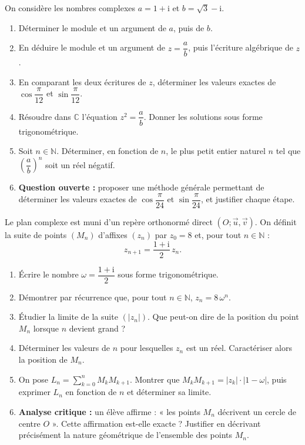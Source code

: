 \documentclass[11pt]{article}
\begin{document}
\begin{exercice}
On considère les nombres complexes $a=1+\mathrm{i}$ et $b=\sqrt{3}-\mathrm{i}$.
\begin{enumerate}
  \item Déterminer le module et un argument de $a$, puis de $b$.
  \item En déduire le module et un argument de $z=\dfrac{a}{b}$, puis l'écriture algébrique de $z$.
  \item En comparant les deux écritures de $z$, déterminer les valeurs exactes de $\cos\dfrac{\pi}{12}$ et $\sin\dfrac{\pi}{12}$.
  \item Résoudre dans $\mathbb{C}$ l'équation $z^2=\dfrac{a}{b}$. Donner les solutions sous forme trigonométrique.
  \item Soit $n\in\mathbb{N}$. Déterminer, en fonction de $n$, le plus petit entier naturel $n$ tel que $\left(\dfrac{a}{b}\right)^n$ soit un réel négatif.
  \item \textbf{Question ouverte :} proposer une méthode générale permettant de déterminer les valeurs exactes de $\cos\dfrac{\pi}{24}$ et $\sin\dfrac{\pi}{24}$, et justifier chaque étape.
\end{enumerate}
\end{exercice}

\begin{exercice}
Le plan complexe est muni d'un repère orthonormé direct $(O;\vec{u},\vec{v})$. On définit la suite de points $(M_n)$ d'affixes $(z_n)$ par $z_0=8$ et, pour tout $n\in\mathbb{N}$ :
\[ z_{n+1}=\frac{1+\mathrm{i}}{2}\,z_n. \]
\begin{enumerate}
  \item Écrire le nombre $\omega=\dfrac{1+\mathrm{i}}{2}$ sous forme trigonométrique.
  \item Démontrer par récurrence que, pour tout $n\in\mathbb{N}$, $z_n=8\,\omega^n$.
  \item Étudier la limite de la suite $(|z_n|)$. Que peut-on dire de la position du point $M_n$ lorsque $n$ devient grand ?
  \item Déterminer les valeurs de $n$ pour lesquelles $z_n$ est un réel. Caractériser alors la position de $M_n$.
  \item On pose $L_n=\displaystyle\sum_{k=0}^{n} M_kM_{k+1}$. Montrer que $M_kM_{k+1}=|z_k|\cdot|1-\omega|$, puis exprimer $L_n$ en fonction de $n$ et déterminer sa limite.
  \item \textbf{Analyse critique :} un élève affirme : « les points $M_n$ décrivent un cercle de centre $O$ ». Cette affirmation est-elle exacte ? Justifier en décrivant précisément la nature géométrique de l'ensemble des points $M_n$.
\end{enumerate}
\end{exercice}
\end{document}
